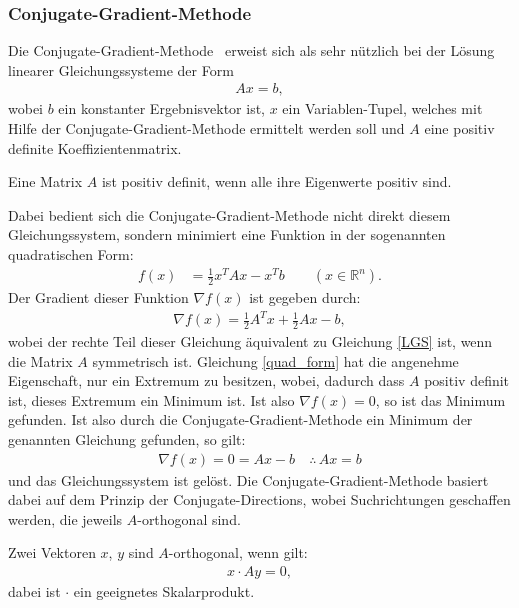 \subsubsection{Conjugate-Gradient-Methode}

Die Conjugate-Gradient-Methode~\cite[nach][]{shewchuk_introduction_1994} erweist sich als sehr nützlich bei der Lösung linearer Gleichungssysteme der Form
\begin{align}
    Ax=b \label{LGS},
\end{align}
wobei $b$ ein konstanter Ergebnisvektor ist, $x$ ein Variablen-Tupel, welches mit Hilfe der Conjugate-Gradient-Methode ermittelt werden soll und $A$ eine positiv definite Koeffizientenmatrix.
\begin{Definition}
    Eine Matrix $A$ ist positiv definit, wenn alle ihre Eigenwerte positiv sind.
\end{Definition}
Dabei bedient sich die Conjugate-Gradient-Methode nicht direkt diesem Gleichungssystem, sondern minimiert eine Funktion in der sogenannten quadratischen Form:
\begin{align}
    f(x)&=\frac{1}{2}x^T A x - x^T b \qquad (x \in \mathbb{R}^n). \label{quad_form}
\end{align}
Der Gradient dieser Funktion $\nabla f(x)$ ist gegeben durch:
\begin{align*}
    \nabla f(x) = \frac{1}{2} A^T x + \frac{1}{2}Ax - b,
\end{align*}
wobei der rechte Teil dieser Gleichung äquivalent zu Gleichung \eqref{LGS} ist, wenn die Matrix $A$ symmetrisch ist. Gleichung \eqref{quad_form} hat die angenehme Eigenschaft, nur ein Extremum zu besitzen, wobei, dadurch dass $A$ positiv definit ist, dieses Extremum ein Minimum ist. Ist also $\nabla f(x)=0$, so ist das Minimum gefunden. Ist also durch die Conjugate-Gradient-Methode ein Minimum der genannten Gleichung gefunden, so gilt:
\begin{align*}
    \nabla f(x)=0=Ax-b \quad \therefore \, Ax=b %
\end{align*}
und das Gleichungssystem ist gelöst.
Die Conjugate-Gradient-Methode basiert dabei auf dem Prinzip der Conjugate-Directions, wobei Suchrichtungen geschaffen werden, die jeweils $A$-orthogonal sind.
\begin{Definition}
    Zwei Vektoren $x$, $y$ sind $A$-orthogonal, wenn gilt:
    \begin{align*}
        x\cdot Ay = 0,
    \end{align*}
    dabei ist $\cdot$ ein geeignetes Skalarprodukt.
\end{Definition}
